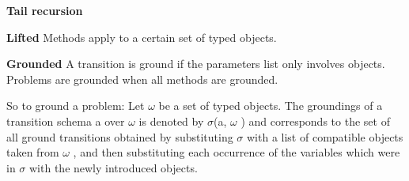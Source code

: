 \textbf{Tail recursion}


\textbf{Lifted}
Methods apply to a certain set of typed objects.

\textbf{Grounded}
A transition is ground if the parameters list only involves objects. 
Problems are grounded when all methods are grounded.

So to ground a problem: Let $\omega$ be a set of typed objects. The groundings of
a transition schema a over $\omega$  is denoted by $\sigma$(a, $\omega$ ) and corresponds to the set of all ground transitions obtained by
substituting $\sigma$ with a list of compatible objects taken from $\omega$ , and then substituting each occurrence of the variables
which were in $\sigma$ with the newly introduced objects.  

